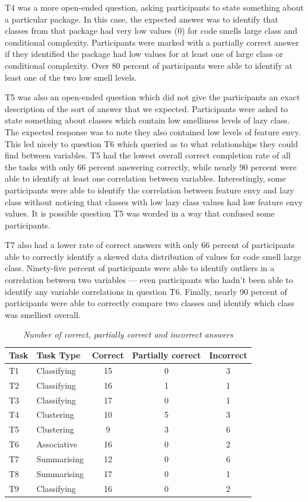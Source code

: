 T4 was a more open-ended question, asking participants to state something about a particular package. In this case, the expected answer was to identify that classes from that package had very low values (0) for code smells large class and conditional complexity. Participants were marked with a partially correct answer if they identified the package had low values for at least one of large class or conditional complexity. Over 80 percent of participants were able to identify at least one of the two low smell levels.

T5 was also an open-ended question which did not give the participants an exact description of the sort of answer that we expected. Participants were asked to state something about classes which contain low smelliness levels of lazy class. The expected response was to note they also contained low levels of feature envy. This led nicely to question T6 which queried as to what relationships they could find between variables. T5 had the lowest overall correct completion rate of all the tasks with only 66 percent answering correctly, while nearly 90 percent were able to identify at least one correlation between variables. Interestingly, some participants were able to identify the correlation between feature envy and lazy class without noticing that classes with low lazy class values had low feature envy values. It is possible question T5 was worded in a way that confused some participants.

T7 also had a lower rate of correct answers with only 66 percent of participants able to correctly identify a skewed data distribution of values for code smell large class. Ninety-five percent of participants were able to identify outliers in a correlation between two variables --- even participants who hadn't been able to identify any variable correlations in question T6. Finally, nearly 90 percent of participants were able to correctly compare two classes and identify which class was smelliest overall. 

\begin{table}
\centering
\caption{\textit{Number of correct, partially correct and incorrect answers}}
\begin{tabular}{|p{1cm}|p{3cm}|c|c|c|} \hline
 \textbf{Task} & \textbf{Task Type} &  \textbf{Correct} & \textbf{Partially correct} &\textbf{Incorrect}\\ \hline
T1	 & Classifying & 	15 & 	0 & 	3\\ \hline
T2	 & Classifying & 	16 & 	1 & 	1\\ \hline
T3	 & Classifying & 	17 & 	0 & 	1\\ \hline
T4	 & Clustering	 & 10 & 	5 & 	3\\ \hline
T5	 & Clustering & 	9 & 	3 & 	6\\ \hline
T6	 & Associative & 	16 & 	0 & 	2\\ \hline
T7	 & Summarising & 	12 & 	0 & 	6\\ \hline
T8	 & Summarising & 	17 & 	0 & 	1\\ \hline
T9	 & Classifying & 	16 & 	0 & 	2\\ \hline
\end{tabular}
\label{tab:tasknumbers}
\end{table}

